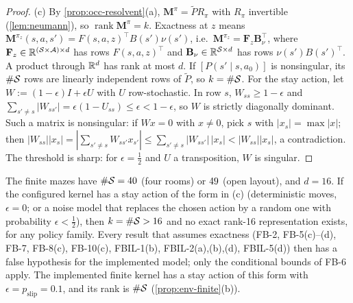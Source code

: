 \begin{proof}
(c) By \cref{prop:occ-resolvent}(a), $\mathbf M^\pi=\tilde PR_\pi$ with $R_\pi$ invertible (\cref{lem:neumann}), so $\operatorname{rank}\mathbf M^\pi=k$.
Exactness at $z$ means $\mathbf M^{\pi_z}(s,a,s')=F(s,a,z)^\top B(s')\nu(s')$, i.e.\ $\mathbf M^{\pi_z}=\mathbf F_z\mathbf B_\nu^\top$, where $\mathbf F_z\in\R^{(\cS\times\cA)\times d}$ has rows $F(s,a,z)^\top$ and $\mathbf B_\nu\in\R^{\cS\times d}$ has rows $\nu(s')B(s')^\top$. A product through $\R^d$ has rank at most $d$.
If $[P(s'\mid s,a_0)]$ is nonsingular, its $\#\cS$ rows are linearly independent rows of $\tilde P$, so $k=\#\cS$.
For the stay action, let $W:=(1-\epsilon)I+\epsilon U$ with $U$ row-stochastic.
In row $s$, $W_{ss}\ge1-\epsilon$ and $\sum_{s'\ne s}|W_{ss'}|=\epsilon(1-U_{ss})\le\epsilon<1-\epsilon$, so $W$ is strictly diagonally dominant.
Such a matrix is nonsingular: if $Wx=0$ with $x\ne0$, pick $s$ with $|x_s|=\max|x|$; then $|W_{ss}||x_s|=|\sum_{s'\ne s}W_{ss'}x_{s'}|\le\sum_{s'\ne s}|W_{ss'}|\,|x_s|<|W_{ss}||x_s|$, a contradiction.
The threshold is sharp: for $\epsilon=\frac12$ and $U$ a transposition, $W$ is singular.
\end{proof}

\begin{remark}\label{rem:fb-rank16}
The finite mazes have $\#\cS=\vn{env.cells.4r}{40}$ (four rooms) or $\vn{env.cells.open}{49}$ (open layout), and $d=16$.
If the configured kernel has a stay action of the form in (c) (deterministic moves, $\epsilon=0$; or a noise model that replaces the chosen action by a random one with probability $\epsilon<\frac12$), then $k=\#\cS>16$ and no exact rank-16 representation exists, for any policy family.
Every result that assumes exactness (FB-2, FB-5(c)--(d), FB-7, FB-8(c), FB-10(c), FBIL-1(b), FBIL-2(a),(b),(d), FBIL-5(d)) then has a false hypothesis for the implemented model; only the conditional bounds of FB-6 apply.
The implemented finite kernel has a stay action of this form with $\epsilon=p_{\mathrm{slip}}=0.1$, and its rank is $\#\cS$ (\cref{prop:env-finite}(b)).
\end{remark}

